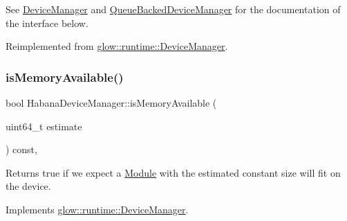 See \hyperlink{classglow_1_1runtime_1_1_device_manager}{Device\+Manager} and \hyperlink{classglow_1_1runtime_1_1_queue_backed_device_manager}{Queue\+Backed\+Device\+Manager} for the documentation of the interface below. 

Reimplemented from \hyperlink{classglow_1_1runtime_1_1_device_manager_a5adbd25b00686c38947ea6380e03e574}{glow\+::runtime\+::\+Device\+Manager}.

\mbox{\label{classglow_1_1runtime_1_1_habana_device_manager_aadaab8c13097bb7ec64b219874549c7f}} 
\subsubsection{\texorpdfstring{is\+Memory\+Available()}{isMemoryAvailable()}}
{\footnotesize\ttfamily bool Habana\+Device\+Manager\+::is\+Memory\+Available (\begin{DoxyParamCaption}\item[{uint64\+\_\+t}]{estimate }\end{DoxyParamCaption}) const\hspace{0.3cm}{\ttfamily [override]}, {\ttfamily [virtual]}}

\begin{DoxyReturn}{Returns}
true if we expect a \hyperlink{classglow_1_1_module}{Module} with the estimated constant size will fit on the device. 
\end{DoxyReturn}


Implements \hyperlink{classglow_1_1runtime_1_1_device_manager_ae9bba4abda9cb6aa1359a69e942feb22}{glow\+::runtime\+::\+Device\+Manager}.

\mbox{\label{classglow_1_1runtime_1_1_habana_device_manager_a345fedf5deacdb44274ed92de5dcc962}} 
